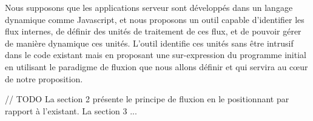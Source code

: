 Nous supposons que les applications serveur sont développés dans un langage dynamique comme Javascript, et nous proposons un outil capable d'identifier les flux internes, de définir des unités de traitement de ces flux, et de pouvoir gérer de manière dynamique ces unités.
L'outil identifie ces unités sans être intrusif dans le code existant mais en proposant une sur-expression du programme initial en utilisant le paradigme de fluxion que nous allons définir et qui servira au cœur de notre proposition.

// TODO
La section 2 présente le principe de fluxion en le positionnant par rapport à l'existant.
La section 3 ...